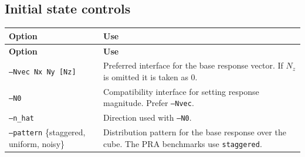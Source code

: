 \documentclass[11pt]{article}
\begin{document}
\subsection{Initial state controls}
\begin{longtable}{L{0.28\textwidth}L{0.64\textwidth}}
\toprule
\textbf{Option} & \textbf{Use} \\
\midrule
\endfirsthead
\toprule
\textbf{Option} & \textbf{Use} \\
\midrule
\endhead
\texttt{--Nvec Nx Ny [Nz]} & Preferred interface for the base response vector. If \(N_z\) is omitted it is taken as 0. \\
\texttt{--N0} & Compatibility interface for setting response magnitude. Prefer \texttt{--Nvec}. \\
\texttt{--n\_hat} & Direction used with \texttt{--N0}. \\
\texttt{--pattern} \{staggered, uniform, noisy\} & Distribution pattern for the base response over the cube. The PRA benchmarks use \texttt{staggered}. \\
\bottomrule
\end{longtable}
\end{document}
